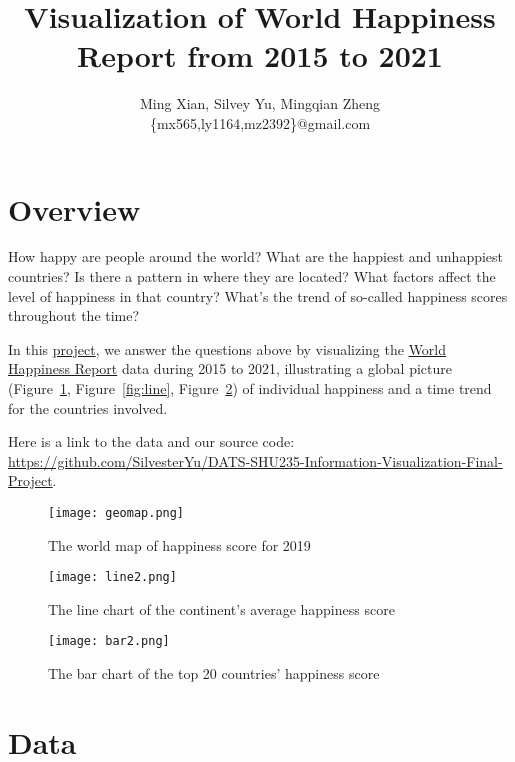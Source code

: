\documentclass{article}
\title{Visualization of World Happiness Report from 2015 to 2021}
\author{Ming Xian, Silvey Yu, Mingqian Zheng\\[\bigskipamount]
\{mx565,ly1164,mz2392\}@gmail.com}
\begin{document}
\maketitle


\section{Overview}

How happy are people around the world? What are the happiest and unhappiest countries? Is there a pattern in where they are located? What factors affect the level of happiness in that country? What’s the trend of so-called happiness scores throughout the time?

In this \href{https://github.com/SilvesterYu/DATS-SHU235-Information-Visualization-Final-Project}{project}, we answer the questions above by visualizing the \href{https://worldhappiness.report/ed/2020/#appendices-and-data}{World Happiness Report} data during 2015 to 2021, illustrating a global picture (Figure~\ref{fig:geomap}, Figure~\ref{fig:line}, Figure~\ref{fig:bar}) of individual happiness and a time trend for the countries involved. 

Here is a link to the data and our source code: \href{https://github.com/SilvesterYu/DATS-SHU235-Information-Visualization-Final-Project}{https://github.com/SilvesterYu/DATS-SHU235-Information-Visualization-Final-Project}.

\begin{figure}[!htb]
	\begin{center}
		\texttt{[image: geomap.png]}
	\end{center}
	\caption{The world map of happiness score for 2019}
	\label{fig:geomap}
\end{figure}

\begin{figure}[!htb]
\begin{minipage}[b]{.48\textwidth}
\centering
\texttt{[image: line2.png]}
\caption{The line chart of the continent's average happiness score}
\label{fig:line}
\end{minipage}
\hfill
\begin{minipage}[b]{.48\textwidth}
\centering
\texttt{[image: bar2.png]}
\caption{The bar chart of the top 20 countries' happiness score}
\label{fig:bar}
\end{minipage}
\end{figure}

\section{Data}
\end{document}
